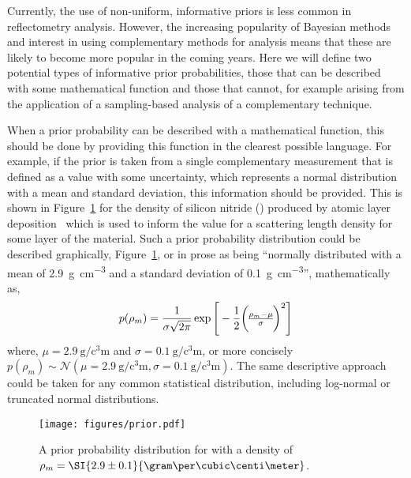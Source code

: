 \documentclass[reprint,superscriptaddress,aps,amsmath]{revtex4-2}
\begin{document}
Currently, the use of non-uniform, informative priors is less common in reflectometry analysis.
However, the increasing popularity of Bayesian methods and interest in using complementary methods for analysis means that these are likely to become more popular in the coming years. 
Here we will define two potential types of informative prior probabilities, those that can be described with some mathematical function and those that cannot, for example arising from the application of a sampling-based analysis of a complementary technique. 

When a prior probability can be described with a mathematical function, this should be done by providing this function in the clearest possible language. 
For example, if the prior is taken from a single complementary measurement that is defined as a value with some uncertainty, which represents a normal distribution with a mean and standard deviation, this information should be provided. 
This is shown in Figure~\ref{fig:prior} for the density of silicon nitride () produced by atomic layer deposition~\cite{knoops_atomic_2015} which is used to inform the value for a scattering length density for some layer of the material.
Such a prior probability distribution could be described graphically, Figure~\ref{fig:prior}, or in prose as being ``normally distributed with a mean of \SI{2.9}{\gram\per\cubic\centi\meter} and a standard deviation of \SI{0.1}{\gram\per\cubic\centi\meter}'', mathematically as, 
%
\begin{equation}
  p(\rho_m) = \frac{1}{\sigma\sqrt{2\pi}}\exp\Bigg[-\frac{1}{2}\bigg{({}\frac{\rho_m-\mu}{\sigma}\bigg)}^2\Bigg]
\end{equation}
%
where, $\mu=\SI{2.9}{\gram\per\cubic\centi\meter}$ and $\sigma=\SI{0.1}{\gram\per\cubic\centi\meter}$, or more concisely $p(\rho_m) \sim \mathcal{N}(\mu=\SI{2.9}{\gram\per\cubic\centi\meter}, \sigma=\SI{0.1}{\gram\per\cubic\centi\meter})$. 
The same descriptive approach could be taken for any common statistical distribution, including log-normal or truncated normal distributions. 
%
\begin{figure}
  \texttt{[image: figures/prior.pdf]}
  \caption{
    A prior probability distribution for  with a density of $\rho_m=\SI{2.9\pm0.1}{\gram\per\cubic\centi\meter}$. 
  }\label{fig:prior}
\end{figure}
%
\end{document}
